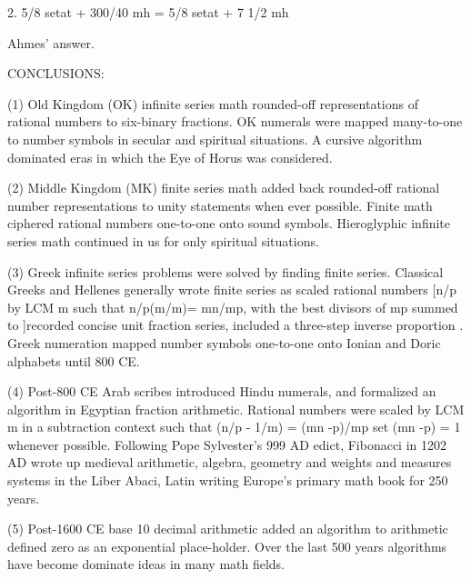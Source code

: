 \documentclass[12pt]{article}
\begin{document}
2. 5/8 setat + 300/40 mh = 5/8 setat + 7 1/2 mh

Ahmes' answer.


CONCLUSIONS:

(1) Old Kingdom (OK) infinite series math rounded-off representations of rational numbers to six-binary fractions. OK numerals were mapped many-to-one to number symbols in secular and spiritual situations. A cursive algorithm dominated eras in which the Eye of Horus was considered.

(2) Middle Kingdom (MK) finite series math added back rounded-off rational number representations to unity statements when ever possible. Finite math ciphered rational numbers one-to-one onto sound symbols. Hieroglyphic infinite series math continued in us for only spiritual situations.

(3) Greek infinite series problems were solved by finding finite series. Classical Greeks and Hellenes generally wrote finite series as scaled rational numbers [n/p by LCM m such that n/p(m/m)= mn/mp, with the best divisors of mp summed to ]recorded concise unit fraction series, included a three-step inverse proportion .  Greek numeration mapped number symbols one-to-one onto Ionian and Doric alphabets until 800 CE.

(4) Post-800 CE Arab scribes introduced Hindu numerals, and formalized an algorithm in Egyptian fraction arithmetic. Rational numbers were scaled by LCM m in a subtraction context such that (n/p - 1/m) = (mn -p)/mp set (mn -p) = 1 whenever possible. Following Pope Sylvester's 999 AD edict, Fibonacci in 1202 AD wrote up medieval arithmetic, algebra, geometry and weights and measures systems in the Liber Abaci, Latin writing Europe's primary math book for 250 years. 

(5) Post-1600 CE base 10 decimal arithmetic added an algorithm to arithmetic defined zero as an exponential place-holder. Over the last 500 years algorithms have become dominate ideas in many math fields. 
\end{document}
